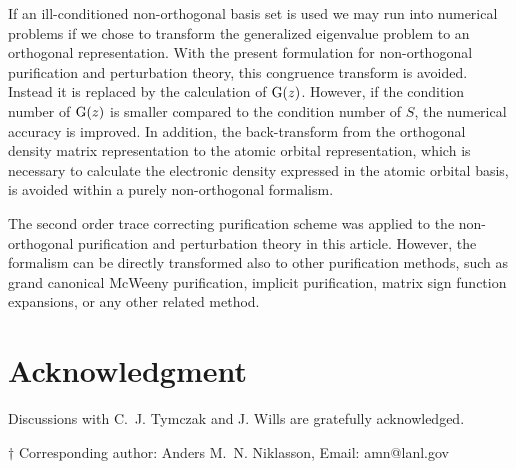 \documentclass[twocolumn,showpacs,preprintnumbers,amsmath,amssymb]{revtex4}
\begin{document}
If an ill-conditioned non-orthogonal basis set is used we may run into numerical problems if we chose to
transform the generalized eigenvalue problem to an orthogonal representation. 
With the present formulation for non-orthogonal purification and perturbation theory, this congruence transform 
is avoided. Instead it is replaced by the calculation of ${\rm G}(z)$.  However, if the condition number of 
${\rm G}(z)$ is smaller compared to the condition number of $S$, the numerical accuracy is improved.
In addition, the back-transform from the orthogonal density matrix representation to the atomic orbital 
representation, which is necessary to calculate the electronic density expressed in the atomic
orbital basis, is avoided within a purely non-orthogonal formalism.

The second order trace correcting purification scheme was applied to the
non-orthogonal purification and perturbation theory in this article. However, the formalism
can be directly transformed also to other purification methods, such as grand canonical McWeeny 
purification, implicit purification, matrix sign function expansions, or any other related method. 


\section{Acknowledgment}

Discussions with C.\ J. Tymczak and J. Wills are gratefully acknowledged.



{${\dagger}$ Corresponding author: Anders M.\ N. Niklasson, Email: amn@lanl.gov}
\end{document}
